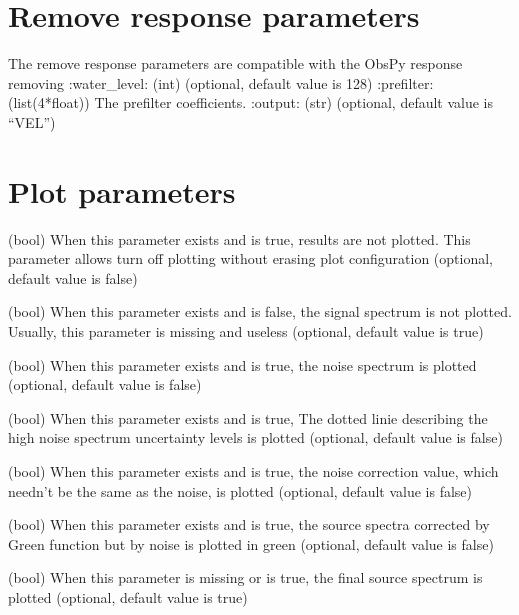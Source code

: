 \documentclass[letterpaper,10pt,english]{sphinxmanual}
\begin{document}
\section{Remove response parameters}
\label{\detokenize{configuration:remove-response-parameters}}
\sphinxAtStartPar
The remove response parameters are compatible with the ObsPy response removing
:water\_level: (int) (optional, default value is 128)
:prefilter: (list(4*float)) The prefilter coefficients.
:output: (str) (optional, default value is “VEL”)


\section{Plot parameters}
\label{\detokenize{configuration:plot-parameters}}\begin{description}
\sphinxAtStartPar
(bool)
When this parameter exists and is true, results are not plotted.
This parameter allows turn off plotting without erasing plot configuration
(optional, default value is false)

\sphinxAtStartPar
(bool)
When this parameter exists and is false,
the signal spectrum is not plotted.
Usually, this parameter is missing and useless (optional, default value is true)

\sphinxAtStartPar
(bool)
When this parameter exists and is true,
the noise spectrum is plotted (optional, default value is false)

\sphinxAtStartPar
(bool) When this parameter exists and is true,
The dotted linie describing the high noise spectrum uncertainty levels is plotted
(optional, default value is false)

\sphinxAtStartPar
(bool)
When this parameter exists and is true,
the noise correction value, which needn’t be the same as the noise, is plotted
(optional, default value is false)

\sphinxAtStartPar
(bool)
When this parameter exists and is true,
the source spectra corrected by Green function but by noise is plotted in green
(optional, default value is false)

\sphinxAtStartPar
(bool)
When this parameter is missing or is true,
the final source spectrum is plotted
(optional, default value is true)


\end{description}
\end{document}
